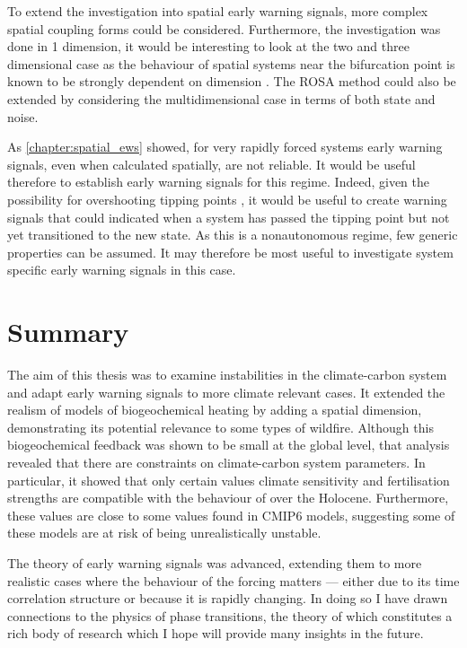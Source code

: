 To extend the investigation into spatial early warning signals, more complex spatial coupling forms could be considered. Furthermore, the investigation was done in 1 dimension, it
would be interesting to look at the two and three dimensional case as the behaviour of spatial systems near the bifurcation point is known to be strongly dependent
on dimension \parencite{Stanley1999}. The ROSA method could also be extended by considering the multidimensional case in terms of both state and noise.

As \cref{chapter:spatial_ews} showed, for very rapidly forced systems early warning signals, even when calculated spatially, are not reliable. It would be useful therefore to
establish early warning signals for this regime. Indeed, given the possibility for overshooting tipping points \parencite{Ritchie2021}, it would be useful to create warning signals that could
indicated when a system has passed the tipping point but not yet transitioned to the new state. As this is a nonautonomous regime, few generic properties can be assumed. It may therefore be
most useful to investigate system specific early warning signals in this case.

\section{Summary}

The aim of this thesis was to examine instabilities in the climate-carbon system and adapt early warning signals to more climate relevant cases.
It extended the realism of models of biogeochemical heating by adding a spatial dimension, demonstrating its potential
relevance to some types of wildfire. Although this biogeochemical feedback was shown to be small at the global level, that analysis revealed that there are constraints on climate-carbon
system parameters. In particular, it showed that only certain values climate sensitivity and  fertilisation strengths are compatible with the behaviour of  over the Holocene.
Furthermore, these values are close to some values found in CMIP6 models, suggesting some of these models are at risk of being unrealistically unstable.

The theory of early warning signals was advanced, extending them to more realistic cases where the behaviour of the forcing matters --- either due to its time correlation structure
or because it is rapidly changing. In doing so I have drawn connections to the physics of phase transitions, the theory of which constitutes a rich body of research which I hope will provide
many insights in the future.